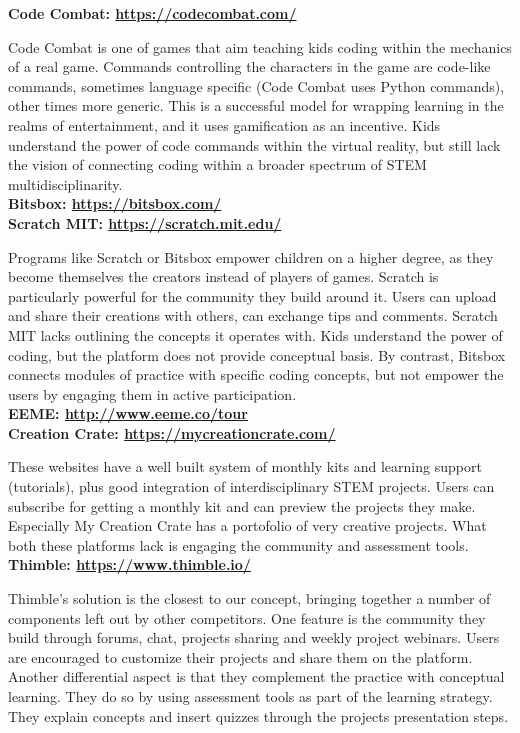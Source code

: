 \textbf{Code Combat: \url{https://codecombat.com/}}

Code Combat is one of games that aim teaching kids coding within the mechanics of a real game. Commands controlling the characters in the game are code-like commands, sometimes language specific (Code Combat uses Python commands), other times more generic. 
This is a successful model for wrapping learning in the realms of entertainment, and it uses gamification as an incentive. Kids understand the power of code commands within the virtual reality, but still lack the vision of connecting coding within a broader spectrum of STEM multidisciplinarity. \\

\textbf{Bitsbox: \url{https://bitsbox.com/}} \\
\textbf{Scratch MIT: \url{https://scratch.mit.edu/}}

Programs like Scratch or Bitsbox empower children on a higher degree, as they become themselves the creators instead of players of games. 
Scratch is particularly powerful for the community they build around it. Users can upload and share their creations with others, can exchange tips and comments. 
Scratch MIT lacks outlining the concepts it operates with. Kids understand the power of coding, but the platform does not provide conceptual basis.
By contrast, Bitsbox connects modules of practice with specific coding concepts, but  not empower the users by engaging them in active participation. \\

\textbf{EEME: \url{http://www.eeme.co/tour}} \\
\textbf{Creation Crate: \url{https://mycreationcrate.com/}}

These websites have a well built system of monthly kits and learning support (tutorials), plus good integration of interdisciplinary STEM projects. Users can subscribe for getting a monthly kit and can preview the projects they  make. Especially My Creation Crate has a portofolio of very creative projects.
What both these platforms lack is engaging the community and assessment tools.\\

\textbf{Thimble: \url{https://www.thimble.io/}}

Thimble's solution is the closest to our concept, bringing together a number of components left out by other competitors. 
One feature is the community they build through forums, chat, projects sharing and weekly project webinars. Users are encouraged to customize their projects and share them on the platform. 
Another differential aspect is that they complement the practice with conceptual learning. They do so by using assessment tools as part of the learning strategy. They explain concepts and insert quizzes through the projects presentation steps.\\

